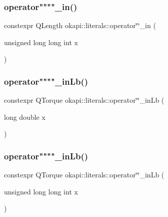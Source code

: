 \mbox{\label{namespaceokapi_1_1literals_a78c6b310757ea9a0e0c48315c194c366}} 
\subsubsection{\texorpdfstring{operator""""\_in()}{operator""\_in()}\hspace{0.1cm}{\footnotesize\ttfamily [2/2]}}
{\footnotesize\ttfamily constexpr Q\+Length okapi\+::literals\+::operator\char`\"{}\char`\"{}\+\_\+in (\begin{DoxyParamCaption}\item[{unsigned long long int}]{x }\end{DoxyParamCaption})}

\mbox{\label{namespaceokapi_1_1literals_aaa3c99e6571a76cd4088d2d55afd357d}} 
\subsubsection{\texorpdfstring{operator""""\_inLb()}{operator""\_inLb()}\hspace{0.1cm}{\footnotesize\ttfamily [1/2]}}
{\footnotesize\ttfamily constexpr Q\+Torque okapi\+::literals\+::operator\char`\"{}\char`\"{}\+\_\+in\+Lb (\begin{DoxyParamCaption}\item[{long double}]{x }\end{DoxyParamCaption})}

\mbox{\label{namespaceokapi_1_1literals_a7bb3fd8e274b246c16fb5d7189e280dc}} 
\subsubsection{\texorpdfstring{operator""""\_inLb()}{operator""\_inLb()}\hspace{0.1cm}{\footnotesize\ttfamily [2/2]}}
{\footnotesize\ttfamily constexpr Q\+Torque okapi\+::literals\+::operator\char`\"{}\char`\"{}\+\_\+in\+Lb (\begin{DoxyParamCaption}\item[{unsigned long long int}]{x }\end{DoxyParamCaption})}

